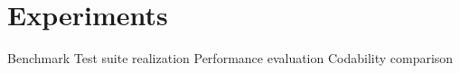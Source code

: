 \chapter{Experiments}
\label{chap:experiments}

Benchmark
Test suite realization
Performance evaluation
Codability comparison


